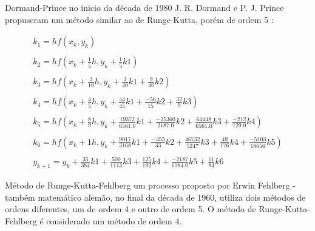 Dormand-Prince no inicio da década de 1980 J. R. Dormand e P. J. Prince propuseram um método similar
ao de Runge-Kutta, porém de ordem 5 \cite{filho2007algoritmos}:

\begin{equation*}
\begin{split}
	k_{1} = hf(x_{k}, y_{k})\\
	\\
    k_{2} = hf(x_{k} + \frac{1}{5}h, y_{k} + \frac{1}{5}k1  )\\
    \\
    k_{3} = hf(x_{k} + \frac{3}{10}h, y_{k} + \frac{3}{40}k1 + \frac{9}{40}k2 )\\
    \\
    k_{4} = hf(x_{k} + \frac{4}{5}h, y_{k} + \frac{44}{45}k1 + \frac{-56}{15}k2 + \frac{32}{9}k3 )\\
    \\
    k_{5} = hf(x_{k} + \frac{8}{9}h, y_{k} + \frac{19372}{6561.0}k1 + \frac{-25360}{2187.0}k2 + \frac{64448}{6561.0}k3 + \frac{-212}{729.0}k4 )\\
    \\
    k_{6} = hf(x_{k} + 1h, y_{k} + \frac{9017}{3168}k1 + \frac{-355}{33}k2 + \frac{46732}{5247}k3 + \frac{49}{176}k4 + \frac{-5103}{18656}k5 )\\
    \\
    y_{k+1} = y_{k} + \frac{35}{384}k1 + \frac{500}{1113}k3 + \frac{125}{192}k4 + \frac{-2187}{6784.0}k5 + \frac{11}{84}k6
\end{split}
\end{equation*}

Método de Runge-Kutta-Fehlberg um processo proposto por Erwin Fehlberg - também matemático alemão, no final 
da década de 1960, utiliza dois métodos de ordens diferentes, um de ordem 4 e outro de
ordem 5. O método de Runge-Kutta-Fehlberg é considerado um método de ordem 4.


